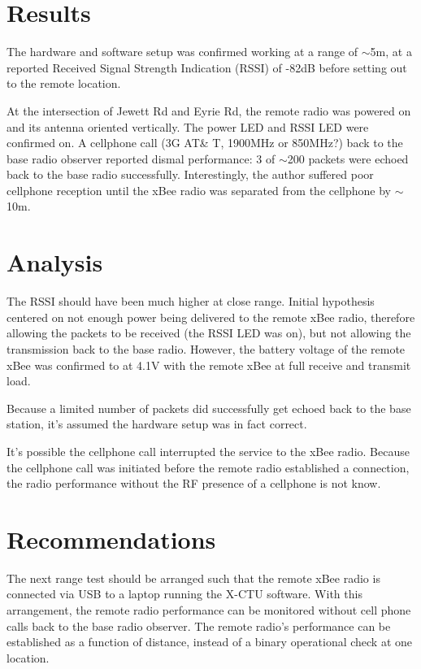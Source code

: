 \documentclass[11pt,letterpaper]{article}
\begin{document}
\section{Results}
The hardware and software setup was confirmed working at a range of $\sim$5m, at a reported Received Signal Strength Indication (RSSI) of -82dB before setting out to the remote location.

At the intersection of Jewett Rd and Eyrie Rd, the remote radio was powered on and its antenna oriented vertically. The power LED and RSSI LED were confirmed on. A cellphone call (3G AT\& T, 1900MHz or 850MHz?) back to the base radio observer reported dismal performance: 3 of $\sim$200 packets were echoed back to the base radio successfully.  Interestingly, the author suffered poor cellphone reception until the xBee radio was separated from the cellphone by $\sim$10m.

\section{Analysis}
The RSSI should have been much higher at close range.  Initial hypothesis centered on not enough power being delivered  to the remote xBee radio, therefore allowing the packets to be received (the RSSI LED was on), but not allowing the transmission back to the base radio.  However, the battery voltage of the remote xBee was confirmed to at 4.1V with the remote xBee at full receive and transmit load.

Because a limited number of packets did successfully get echoed back to the base station, it's assumed the hardware setup was in fact correct.

It's possible the cellphone call interrupted the service to the xBee radio.  Because the cellphone call was initiated before the remote radio established a connection, the radio performance without the RF presence of a cellphone is not know.

\section{Recommendations}
The next range test should be arranged such that the remote xBee radio is connected via USB to a laptop running the X-CTU software.  With this arrangement, the remote radio performance can be monitored without cell phone calls back to the base radio observer.  The remote radio's performance can be established as a function of distance, instead of a binary operational check at one location.
\end{document}
